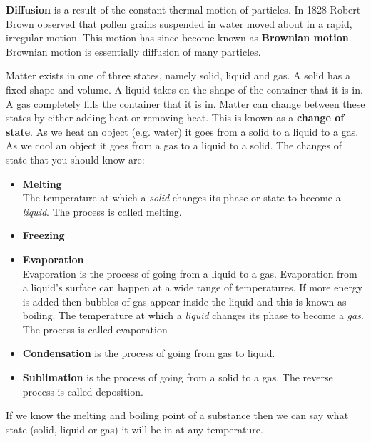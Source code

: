 \par 
\label{m38736*id10987324}\textbf{Diffusion} is a result of the constant thermal motion of particles. In 1828 Robert Brown observed that pollen grains suspended in water moved about in a rapid, irregular motion. This motion has since become known as \textbf{Brownian motion}. Brownian motion is essentially diffusion of many particles.
\par 
\label{m38736*id48327}Matter exists in one of three states, namely solid, liquid and gas. A solid has a fixed shape and volume. A liquid takes on the shape of the container that it is in. A gas completely fills the container that it is in. Matter can change between these states by either adding heat or removing heat. This is known as a \textbf{change of state}. As we heat an object (e.g. water) it goes from a solid to a liquid to a gas. As we cool an object it goes from a gas to a liquid to a solid.
The changes of state that you should know are:
\label{m38736*id02341}\begin{itemize}[noitemsep]
\item \textbf{Melting} \\ 
 { \label{m38734*meaningfhsst!!!underscore!!!id276}
The temperature at which a \textsl{solid} changes 
its phase or state to become a \textsl{liquid}. The 
process is called melting. 
 } 
\item \textbf{Freezing} \\
\item \textbf{Evaporation} \\
Evaporation is the process of going from a liquid to a gas. Evaporation from a liquid's surface can happen at a wide range of temperatures. If more energy is added then bubbles of gas appear inside the liquid and this is known as boiling.
 { \label{m38734*meaningfhsst!!!underscore!!!id282}
The temperature at which a \textsl{liquid} changes its phase to become a \textsl{gas}. The process is called evaporation} 
\item \textbf{Condensation} is the process of going from gas to liquid.
\item \textbf{Sublimation} is the process of going from a solid to a gas. The reverse process is called deposition.\end{itemize}
\par \label{m38736*eip-957}If we know the melting and boiling point of a substance then we can say what state (solid, liquid or gas) it will be in at any temperature. \par 
